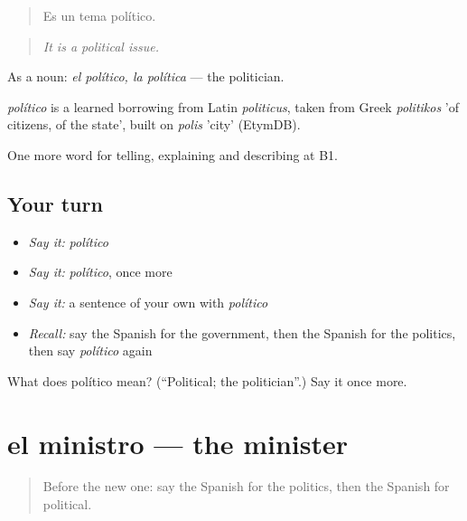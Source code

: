 \begin{quote}
Es un tema político.
\end{quote}

\begin{quote}
\emph{It is a political issue.}
\end{quote}

As a noun: \emph{el político, la política} — the politician.

\begin{cousinweb}
\emph{político} is a learned borrowing from Latin \emph{politicus}, taken from Greek \emph{politikos} 'of citizens, of the state', built on \emph{polis} 'city' (EtymDB).
\end{cousinweb}

\begin{grammarlens}[title={What you've built}]
One more word for telling, explaining and describing at B1.
\end{grammarlens}

\subsection*{Your turn}
\begin{itemize}
\raggedright
  \item \emph{Say it:} \emph{político}
  \item \emph{Say it:} \emph{político}, once more
  \item \emph{Say it:} a sentence of your own with \emph{político}
  \item \emph{Recall:} say the Spanish for the government, then the Spanish for the politics, then say \emph{político} again
\end{itemize}

\begin{tcolorbox}[breakable,colback=teal!4,colframe=teal!35!black,title={Before you move on}]
What does político mean? (\textquotedblleft{}Political; the politician\textquotedblright{}.) Say it once more.
\end{tcolorbox}
\section[el ministro]{el ministro — the minister}

\label{lesson:ES-C601-ministro}



\begin{quote}
Before the new one: say the Spanish for the politics, then the Spanish for political.
\end{quote}

